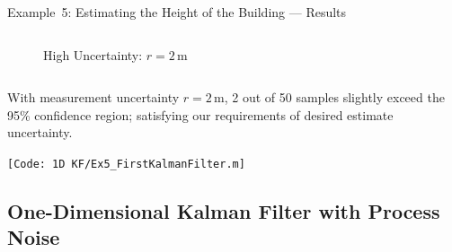 \begin{frame}{Example~5: Estimating the Height of the Building --- Results}
\begin{columns}
\begin{figure}
  \vspace{-20pt}
 \caption{High Uncertainty: $r=2$\,m}
    \end{figure}
\end{columns}

With measurement uncertainty $r=2$\,m, 2 out of 50 samples slightly exceed the 95\% confidence region; satisfying our requirements of desired estimate uncertainty.

\texttt{\tiny [Code: 1D KF/Ex5\_FirstKalmanFilter.m]}
\end{frame}

\subsection{One-Dimensional Kalman Filter with Process Noise}
